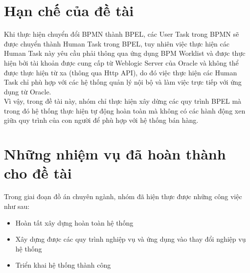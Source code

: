 \section{Hạn chế của đề tài}
\hspace{0.5cm} Khi thực hiện chuyển đổi BPMN thành BPEL, các User Task trong BPMN sẽ được chuyển thành Human Task trong BPEL, tuy nhiên việc thực hiện các Human Task này yêu cầu phải thông qua ứng dụng BPM Worklist và được thực hiện bởi tài khoản được cung cấp từ Weblogic Server của Oracle và không thể được thực hiện từ xa (thông qua Http API), do đó việc thực hiện các Human Task chỉ phù hợp với các hệ thống quản lý nội bộ và làm việc trực tiếp với ứng dụng từ Oracle. \\

Vì vậy, trong đề tài này, nhóm chỉ thực hiện xây dừng các quy trình BPEL mà trong đó hệ thống thực hiện tự động hoàn toàn mà không có các hành động xen giữa quy trình của con người để phù hợp với hệ thống bán hàng.


\section{Những nhiệm vụ đã hoàn thành cho đề tài}
Trong giai đoạn đồ án chuyên ngành, nhóm đã hiện thực được những công việc như sau:
\begin{itemize}
    \item Hoàn tất xây dựng hoàn toàn hệ thống
    \item Xây dựng được các quy trình nghiệp vụ và ứng dụng vào thay đổi nghiệp vụ hệ thống
    \item Triển khai hệ thống thành công
\end{itemize}




